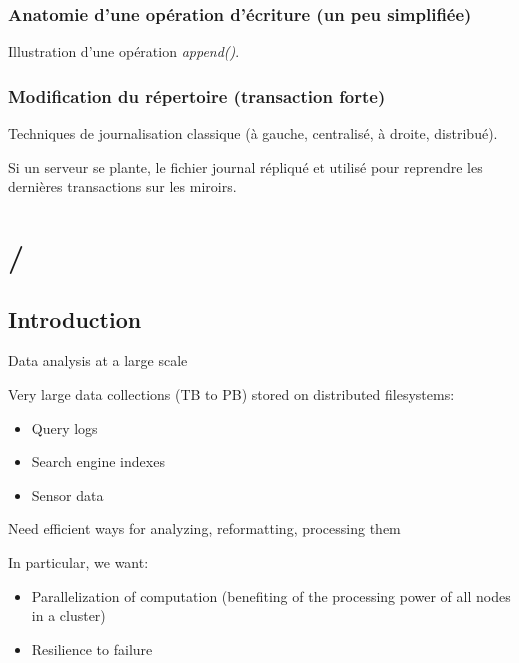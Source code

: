 \begin{frame}
\frametitle{Anatomie d'une opération d'écriture (un peu simplifiée)}

Illustration d'une opération \textit{append()}.


\end{frame}

\begin{frame}
\frametitle{Modification du répertoire (transaction forte)}

Techniques de journalisation classique (à gauche, centralisé, à droite, distribué).



Si un serveur se plante, le fichier journal répliqué et utilisé pour 
reprendre les dernières transactions sur les miroirs.

\end{frame}



\section{\mapreduce/}


\subsection{Introduction}

\begin{frame}{Data analysis at a large scale}

 \alert{Very large}
data collections (TB to PB) stored on distributed filesystems:

\begin{itemize}
\item Query logs
\item Search engine indexes
\item Sensor data
\end{itemize}
\vfill

Need \alert{efficient ways} for analyzing, reformatting, processing
them

\vfill
 In particular, we want:

\begin{itemize}
\item Parallelization of computation (benefiting of the processing power
of all nodes in a cluster)
\item Resilience to failure
\end{itemize}

\end{frame}
 
